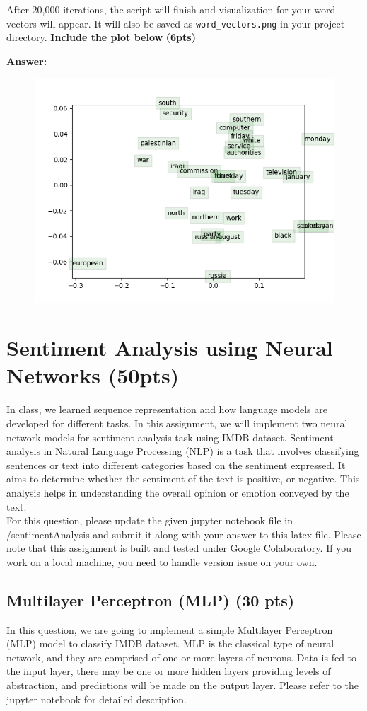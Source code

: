 \documentclass{assignment format}
\newenvironment{answer}{
    {\bf Answer:} \begingroup\color{red}
}{\endgroup}%
\begin{document}
\begin{enumerate}[label=(\alph*)]
    After 20,000 iterations, the script will finish and visualization for your word vectors will appear. It will also be saved as \texttt{word\_vectors.png} in your project directory. \textbf{Include the plot below} \textbf{(6pts)}
    
    \begin{answer}
\begin{figure}[h!]
    \centering
    \includegraphics[width=0.5\linewidth]{word_vectors.png}
    \label{fig:enter-label}
\end{figure}
    \end{answer}
\end{enumerate}
\section{Sentiment Analysis using Neural Networks (50pts)}

In class, we learned sequence representation and how language models are developed for different tasks. In this assignment, we will implement two neural network models for sentiment analysis task using IMDB dataset. Sentiment analysis in Natural Language Processing (NLP) is a task that involves classifying sentences or text into different categories based on the sentiment expressed. It aims to determine whether the sentiment of the text is positive, or negative. This analysis helps in understanding the overall opinion or emotion conveyed by the text.\\
For this question, please update the given jupyter notebook file in /sentimentAnalysis and submit it along with your answer to this latex file. Please note that this assignment is built and tested under Google Colaboratory. If you work on a local machine, you need to handle version issue on your own. 
\subsection{Multilayer Perceptron (MLP) (30 pts)}
In this question, we are going to implement a simple Multilayer Perceptron (MLP) model to classify IMDB dataset. MLP is the classical type of neural network, and they are comprised of one or more layers of neurons. Data is fed to the input layer, there may be one or more hidden layers providing levels of abstraction, and predictions will be made on the output layer. Please refer to the jupyter notebook for detailed description.
\end{document}
